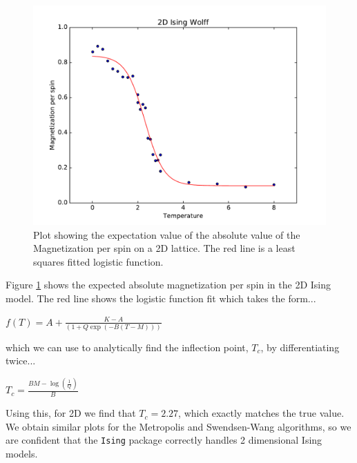 \documentclass[a4paper]{article}
\begin{document}
\begin{figure}[htb!]
	\centering \includegraphics[width=\linewidth]{2D_Wolff.pdf}
	\caption{Plot showing the expectation value of the absolute value of the Magnetization per spin on a 2D lattice. The red line is a least squares fitted logistic function.}
	\label{fig:wolff2}
\end{figure}

Figure \ref{fig:wolff2} shows the expected absolute magnetization per spin in the 2D Ising model. The red line shows the logistic function fit which takes the form...
\begin{center}
	$f(T)=A+\frac{K-A}{(1+Q\exp(-B(T-M)))}$
\end{center}
which we can use to analytically find the inflection point, $T_{c}$, by differentiating twice...
\begin{center}
	$T_{c}=\frac{BM-\log\left(\frac{1}{Q}\right)}{B}$
\end{center}

Using this, for 2D we find that $T_{c}=2.27$, which exactly matches the true value. We obtain similar plots for the Metropolis and Swendsen-Wang algorithms, so we are confident that the \texttt{Ising} package correctly handles 2 dimensional Ising models.
\end{document}
